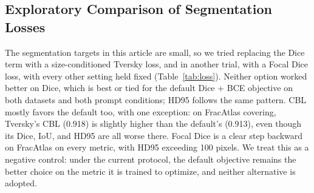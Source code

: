 \subsection{Exploratory Comparison of Segmentation Losses}
\label{sec:loss}
The segmentation targets in this article are small, so we tried replacing the Dice term with a size-conditioned Tversky loss, and in another trial, with a Focal Dice loss, with every other setting held fixed (Table~\ref{tab:loss}). Neither option worked better on Dice, which is best or tied for the default Dice + BCE objective on both datasets and both prompt conditions; HD95 follows the same pattern. CBL mostly favors the default too, with one exception: on FracAtlas covering, Tversky's CBL (0.918) is slightly higher than the default's (0.913), even though its Dice, IoU, and HD95 are all worse there. Focal Dice is a clear step backward on FracAtlas on every metric, with HD95 exceeding 100 pixels. We treat this as a negative control: under the current protocol, the default objective remains the better choice on the metric it is trained to optimize, and neither alternative is adopted.

\begin{table}[t]
\caption{Exploratory segmentation-loss comparison for PGA-UNet at $512\times512$, everything else fixed. Dice, IoU, HD95, and CBL as covering / off-center. The default is not changed.}
\label{tab:loss}
\centering
\scriptsize
{}
\end{table}

